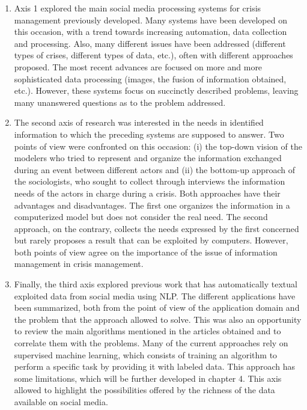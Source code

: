 \begin{enumerate}
    \item Axis 1 explored the main social media processing systems for crisis management previously developed.
          Many systems have been developed on this occasion, with a trend towards increasing automation, data collection and processing.
          Also, many different issues have been addressed (different types of crises, different types of data, etc.), often with different approaches proposed.
          The most recent advances are focused on more and more sophisticated data processing (images, the fusion of information obtained, etc.).
          However, these systems focus on succinctly described problems, leaving many unanswered questions as to the problem addressed.
    \item The second axis of research was interested in the needs in identified information to which the preceding systems are supposed to answer.
          Two points of view were confronted on this occasion: (i) the top-down vision of the modelers who tried to represent and organize the information exchanged during an event between different actors and
          (ii) the bottom-up approach of the sociologists, who sought to collect through interviews the information needs of the actors in charge during a crisis.
          Both approaches have their advantages and disadvantages. The first one organizes the information in a computerized model but does not consider the real need.
          The second approach, on the contrary, collects the needs expressed by the first concerned but rarely proposes a result that can be exploited by computers.
          However, both points of view agree on the importance of the issue of information management in crisis management.
    \item Finally, the third axis explored previous work that has automatically textual exploited data from social media using NLP.
          The different applications have been summarized, both from the point of view of the application domain and the problem that the approach allowed to solve.
          This was also an opportunity to review the main algorithms mentioned in the articles obtained and to correlate them with the problems.
          Many of the current approaches rely on supervised machine learning, which consists of training an algorithm to perform a specific task by providing it with labeled data.
          This approach has some limitations, which will be further developed in chapter 4.
          This axis allowed to highlight the possibilities offered by the richness of the data available on social media.
\end{enumerate}

